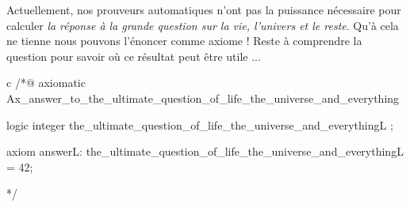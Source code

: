 









Actuellement, nos prouveurs automatiques n'ont pas la puissance nécessaire
pour calculer \textit{la réponse à la grande question sur la vie, l'univers et le
reste}. Qu'à cela ne tienne nous pouvons l'énoncer comme axiome ! Reste à
comprendre la question pour savoir où ce résultat peut être utile ...

\begin{CodeBlock}{c}
/*@
  axiomatic Ax_answer_to_the_ultimate_question_of_life_the_universe_and_everything {
    logic integer the_ultimate_question_of_life_the_universe_and_everything{L} ;

    axiom answer{L}:
      the_ultimate_question_of_life_the_universe_and_everything{L} = 42;
  }
*/
\end{CodeBlock}




